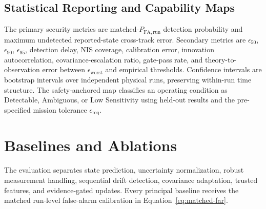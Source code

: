 \documentclass[11pt,a4paper]{article}
\begin{document}
\subsection{Statistical Reporting and Capability Maps}
The primary security metrics are matched-$P_{\mathrm{FA,run}}$ detection probability and maximum undetected reported-state cross-track error. Secondary metrics are $\epsilon_{50}$, $\epsilon_{90}$, $\epsilon_{95}$, detection delay, NIS coverage, calibration error, innovation autocorrelation, covariance-escalation ratio, gate-pass rate, and theory-to-observation error between $\epsilon_{\mathrm{worst}}$ and empirical thresholds. Confidence intervals are bootstrap intervals over independent physical runs, preserving within-run time structure. The safety-anchored map classifies an operating condition as Detectable, Ambiguous, or Low Sensitivity using held-out results and the pre-specified mission tolerance $\epsilon_{\mathrm{req}}$.

\section{Baselines and Ablations}
\label{sec:baselines}

The evaluation separates state prediction, uncertainty normalization, robust measurement handling, sequential drift detection, covariance adaptation, trusted features, and evidence-gated updates. Every principal baseline receives the matched run-level false-alarm calibration in Equation~\eqref{eq:matched-far}.
\end{document}
